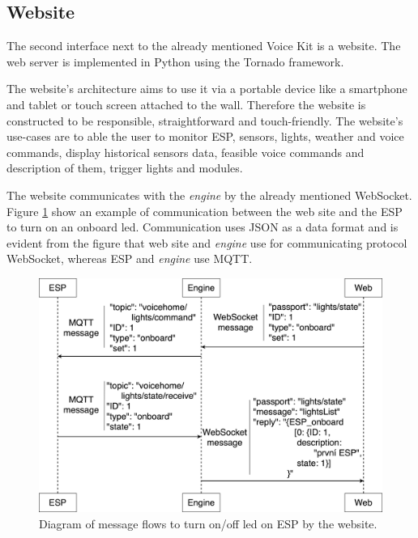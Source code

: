 \subsection{Website}

The second interface next to the already mentioned Voice Kit is a website. The web server is implemented in Python using the Tornado framework.

The website's architecture aims to use it via a portable device like a smartphone and tablet or touch screen attached to the wall. Therefore the website is constructed to be responsible, straightforward and touch-friendly. The website's use-cases are to able the user to monitor ESP, sensors, lights, weather and voice commands, display historical sensors data, feasible voice commands and description of them, trigger lights and modules.

The website communicates with the \textit{engine} by the already mentioned WebSocket. Figure \ref{fig:lights_onoff_messages} show an example of communication between the web site and the ESP to turn on an onboard led. Communication uses JSON as a data format and is evident from the figure that web site and \textit{engine} use for communicating protocol WebSocket, whereas ESP and \textit{engine} use MQTT.

\begin{figure}[H]
	\centering
	\includegraphics[width=\textwidth]{img/lights_onoff_messages.png}
	\caption{Diagram of message flows to turn on/off led on ESP by the website.}
	\label{fig:lights_onoff_messages}
\end{figure}
